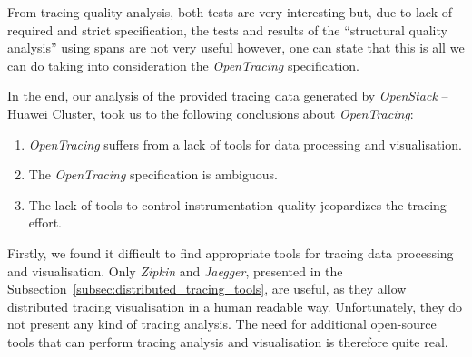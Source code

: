 From tracing quality analysis, both tests are very interesting but, due to lack of required and strict specification, the tests and results of the ``structural quality analysis'' using spans are not very useful however, one can state that this is all we can do taking into consideration the \emph{OpenTracing} specification.


In the end, our analysis of the provided tracing data generated by \emph{OpenStack} -- Huawei Cluster, took us to the following conclusions about \emph{OpenTracing}:

\begin{enumerate}
    \item \emph{OpenTracing} suffers from a lack of tools for data processing and visualisation.
    \item The \emph{OpenTracing} specification is ambiguous.
    \item The lack of tools to control instrumentation quality jeopardizes the tracing effort.
\end{enumerate}


Firstly, we found it difficult to find appropriate tools for tracing data processing and visualisation. Only \emph{Zipkin} and \emph{Jaegger}, presented in the Subsection~\ref{subsec:distributed_tracing_tools}, are useful, as they allow distributed tracing visualisation in a human readable way. Unfortunately, they do not present any kind of tracing analysis. The need for additional open-source tools that can perform tracing analysis and visualisation is therefore quite real.


